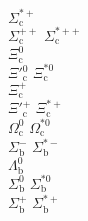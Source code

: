 \begin{tabbing}
                                  \>$\Sigma_{\mbox{c}}^{*+}$ \\
    \>$\Sigma_{\mbox{c}}^{++}$      
                                  \>$\Sigma_{\mbox{c}}^{*++}$ \\
    \>$\Xi_{\mbox{c}}^0$    \> \> \\
    \>$\Xi'$$_{\mbox{c}}^0$         
                                  \>$\Xi_{\mbox{c}}^{*0}$ \\
    \>$\Xi_{\mbox{c}}^+$    \> \> \\
    \>$\Xi'$$_{\mbox{c}}^+$         
                                  \>$\Xi_{\mbox{c}}^{*+}$ \\
    \>$\Omega_{\mbox{c}}^0$
                                  \>$\Omega_{\mbox{c}}^{*0}$ \\
    \>$\Sigma_{\mbox{b}}^-$ 
                                  \>$\Sigma_{\mbox{b}}^{*-}$ \\
    \>$\Lambda_{\mbox{b}}^0$        \>\> \\
    \>$\Sigma_{\mbox{b}}^0$ 
                                  \>$\Sigma_{\mbox{b}}^{*0}$ \\
    \>$\Sigma_{\mbox{b}}^+$ 
                                  \>$\Sigma_{\mbox{b}}^{*+}$
\end{tabbing}

\pagebreak

